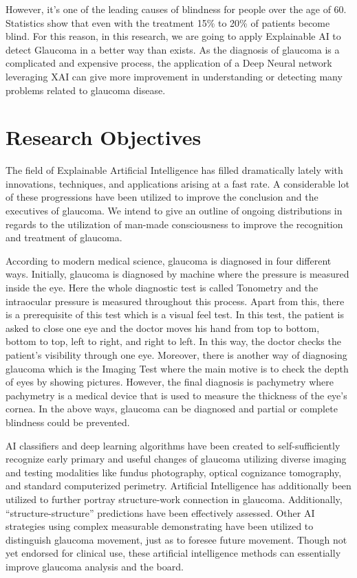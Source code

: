 \vspace{5mm}
\noindent However, it's one of the leading causes of blindness for people over the age of 60. Statistics show that even with the treatment 15\% to 20\% of patients become blind. For this reason, in this research, we are going to apply Explainable AI to detect Glaucoma in a better way than exists. As the diagnosis of glaucoma is a complicated and expensive process, the application of a Deep Neural network leveraging XAI can give more improvement in understanding or detecting many problems related to glaucoma disease.

\section{Research Objectives}
The field of Explainable Artificial Intelligence has filled dramatically lately with innovations, techniques, and applications arising at a fast rate. A considerable lot of these progressions have been utilized to improve the conclusion and the executives of glaucoma. We intend to give an outline of ongoing distributions in regards to the utilization of man-made consciousness to improve the recognition and treatment of glaucoma.

\vspace{5mm}
\noindent According to modern medical science, glaucoma is diagnosed in four different ways. Initially, glaucoma is diagnosed by machine where the pressure is measured inside the eye. Here the whole diagnostic test is called Tonometry and the intraocular pressure is measured throughout this process. Apart from this, there is a prerequisite of this test which is a visual feel test. In this test, the patient is asked to close one eye and the doctor moves his hand from top to bottom, bottom to top, left to right, and right to left. In this way, the doctor checks the patient’s visibility through one eye. Moreover, there is another way of diagnosing glaucoma which is the Imaging Test where the main motive is to check the depth of eyes by showing pictures. However, the final diagnosis is pachymetry where pachymetry is a medical device that is used to measure the thickness of the eye’s cornea. In the above ways, glaucoma can be diagnosed and partial or complete blindness could be prevented.

\vspace{5mm}
\noindent AI classifiers and deep learning algorithms have been created to self-sufficiently recognize early primary and useful changes of glaucoma utilizing diverse imaging and testing modalities like fundus photography, optical cognizance tomography, and standard computerized perimetry. Artificial Intelligence has additionally been utilized to further portray structure-work connection in glaucoma. Additionally, “structure-structure” predictions have been effectively assessed. Other AI strategies using complex measurable demonstrating have been utilized to distinguish glaucoma movement, just as to foresee future movement. Though not yet endorsed for clinical use, these artificial intelligence methods can essentially improve glaucoma analysis and the board.

